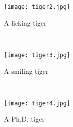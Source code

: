 \begin{figure}[tp]
\begin{minipage}{0.32\textwidth}
    \centering
    \texttt{[image: tiger2.jpg]}
  \caption{  \label{fig:curr_driven_load_line}A licking tiger}
\end{minipage}
~
\begin{minipage}{0.32\textwidth}
    \centering
    \texttt{[image: tiger3.jpg]}
    \caption{\label{fig:curr_driven_spice}A smiling tiger}
\end{minipage}
~
\begin{minipage}{0.32\textwidth}
    \centering
    \texttt{[image: tiger4.jpg]}
    \caption{ \label{fig:spice_i_v_in_phase} A Ph.D. tiger}
\end{minipage}
\end{figure}